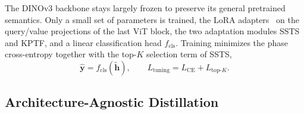 %
%

The DINOv3 backbone stays largely frozen to preserve its general pretrained semantics. Only a
small set of parameters is trained, the LoRA adapters~\cite{hu2022lora} on the query/value projections of the
last ViT block, the two adaptation modules SSTS and KPTF, and a linear classification head
$f_{\mathrm{cls}}$.
Training minimizes the phase cross-entropy together with the top-$K$ selection term of SSTS,
\begin{equation}
  \hat{\mathbf{y}} = f_{\mathrm{cls}}(\tilde{\mathbf{h}}), \qquad
  L_\mathrm{tuning} = L_\mathrm{CE} + L_{\mathrm{top}\text{-}K}.
\end{equation}

\subsection{Architecture-Agnostic Distillation}  %
\label{sec:method:distill}


